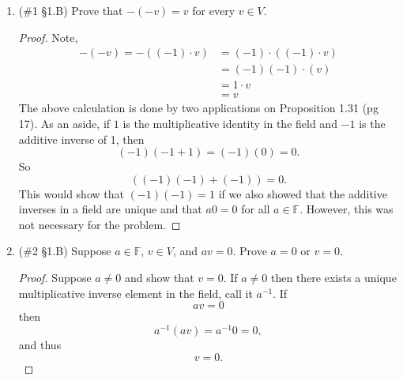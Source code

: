 \documentclass[12pt,letterpaper]{article}
\theoremstyle{plain}
\theoremstyle{definition}
\begin{document}
\begin{enumerate}[1.]
\begin{proof} Note,
\begin{align*}
\lambda \cdot (x+y)&=\lambda \cdot \left((x_1,\ldots ,x_n)+(y_1,\ldots ,y_n)\right)\\
&=\lambda \cdot (x_1+y_1, \ldots x_n+y_n)\\
&=(\lambda(x_1+y_1), \ldots \lambda(x_n+y_n))\\
&=(\lambda x_1+\lambda y_1, \ldots \lambda x_n+\lambda y_n)\\
&=(\lambda x_1, \ldots \lambda x_n)+(\lambda y_1, \ldots \lambda y_n)\\
&=\lambda x +\lambda y.
\end{align*}
The above calculation relies on the definition of the binary operations and from the distribution property of the field multiplication.
\end{proof}
\ \\
\hrule 
\ \\
For the next two problems let $\mathbb{F}$ be an arbitrary field and $V$ a vector space over $\mathbb{F}$.
\ \\
\hrule
\ \\ 
\item (\#1 \S 1.B) Prove that $-(-v)=v$ for every $v\in V$. 
\begin{proof}Note, 
\begin{align*}
-(-v)=-((-1)\cdot v)&=(-1)\cdot((-1)\cdot v)\\
&=(-1)(-1)\cdot (v)\\
&=1\cdot v\\
&=v
\end{align*}
The above calculation is done by two applications on Proposition 1.31 (pg 17). As an aside, if $1$ is the multiplicative identity in the field and $-1$ is the additive inverse of 1, then 
\[(-1)(-1+1)=(-1)(0)=0.\]
So 
\[((-1)(-1)+(-1))=0.\]
This would show that $(-1)(-1)=1$ if we also showed that the additive inverses in a field are unique and that $a0=0$ for all $a\in \mathbb{F}$. However, this was not necessary for the problem. 
\end{proof}
\item (\#2 \S 1.B) Suppose $a\in \mathbb{F}$, $v\in V$, and $av=0$. Prove $a=0$ or $v=0$. 
\begin{proof}
Suppose $a\neq 0$ and show that $v=0$. If $a\neq 0$ then there exists a unique multiplicative inverse element in the field, call it $a^{-1}$. If 
\[av=0\]
then 
\[a^{-1} (av)=a^{-1}0=0,\]
and thus
\[v=0. \]

\end{proof}
\end{enumerate}
\end{document}
